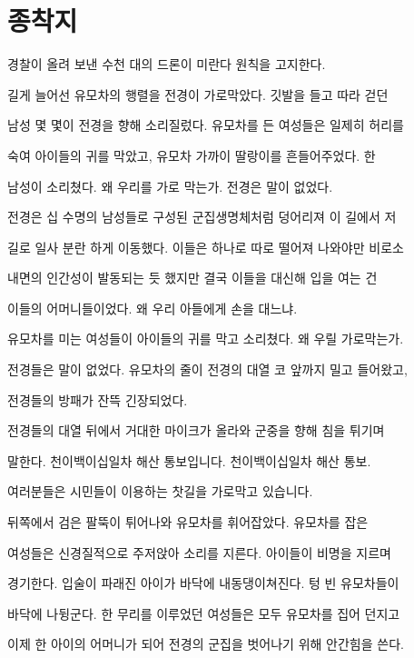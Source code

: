 \hypertarget{uxc885uxcc29uxc9c0}{%

\section{종착지}\label{uxc885uxcc29uxc9c0}}



경찰이 올려 보낸 수천 대의 드론이 미란다 원칙을 고지한다.



길게 늘어선 유모차의 행렬을 전경이 가로막았다. 깃발을 들고 따라 걷던

남성 몇 몇이 전경을 향해 소리질렀다. 유모차를 든 여성들은 일제히 허리를

숙여 아이들의 귀를 막았고, 유모차 가까이 딸랑이를 흔들어주었다. 한

남성이 소리쳤다. 왜 우리를 가로 막는가. 전경은 말이 없었다.



전경은 십 수명의 남성들로 구성된 군집생명체처럼 덩어리져 이 길에서 저

길로 일사 분란 하게 이동했다. 이들은 하나로 따로 떨어져 나와야만 비로소

내면의 인간성이 발동되는 듯 했지만 결국 이들을 대신해 입을 여는 건

이들의 어머니들이었다. 왜 우리 아들에게 손을 대느냐.



유모차를 미는 여성들이 아이들의 귀를 막고 소리쳤다. 왜 우릴 가로막는가.

전경들은 말이 없었다. 유모차의 줄이 전경의 대열 코 앞까지 밀고 들어왔고,

전경들의 방패가 잔뜩 긴장되었다.



전경들의 대열 뒤에서 거대한 마이크가 올라와 군중을 향해 침을 튀기며

말한다. 천이백이십일차 해산 통보입니다. 천이백이십일차 해산 통보.

여러분들은 시민들이 이용하는 찻길을 가로막고 있습니다.



뒤쪽에서 검은 팔뚝이 튀어나와 유모차를 휘어잡았다. 유모차를 잡은

여성들은 신경질적으로 주저앉아 소리를 지른다. 아이들이 비명을 지르며

경기한다. 입술이 파래진 아이가 바닥에 내동댕이쳐진다. 텅 빈 유모차들이

바닥에 나뒹군다. 한 무리를 이루었던 여성들은 모두 유모차를 집어 던지고

이제 한 아이의 어머니가 되어 전경의 군집을 벗어나기 위해 안간힘을 쓴다.

